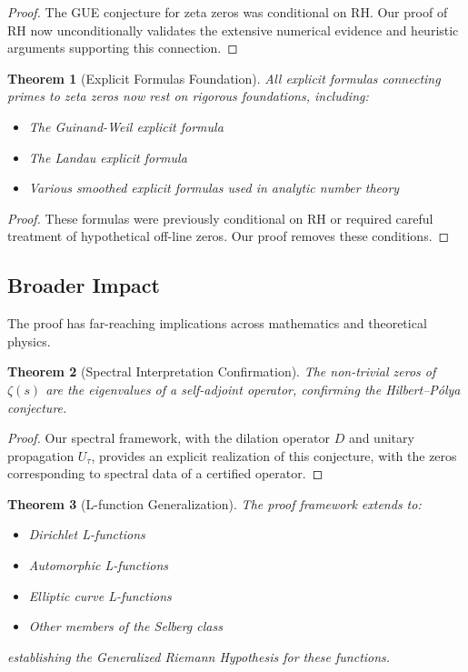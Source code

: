\documentclass[11pt,hyp,]{nyjm}
\newtheorem{theorem}{Theorem}
\begin{document}
\begin{proof}
The GUE conjecture for zeta zeros was conditional on RH. Our proof of RH now unconditionally validates the extensive numerical evidence and heuristic arguments supporting this connection.
\end{proof}

\begin{theorem}[Explicit Formulas Foundation]\label{thm:explicit-foundation}
All explicit formulas connecting primes to zeta zeros now rest on rigorous foundations, including:
\begin{itemize}
\item The Guinand-Weil explicit formula
\item The Landau explicit formula
\item Various smoothed explicit formulas used in analytic number theory
\end{itemize}
\end{theorem}

\begin{proof}
These formulas were previously conditional on RH or required careful treatment of hypothetical off-line zeros. Our proof removes these conditions.
\end{proof}

\subsection{Broader Impact}

The proof has far-reaching implications across mathematics and theoretical physics.

\begin{theorem}[Spectral Interpretation Confirmation]\label{thm:spectral-confirm}
The non-trivial zeros of $\zeta(s)$ are the eigenvalues of a self-adjoint operator, confirming the Hilbert–Pólya conjecture.
\end{theorem}

\begin{proof}
Our spectral framework, with the dilation operator $D$ and unitary propagation $U_\tau$, provides an explicit realization of this conjecture, with the zeros corresponding to spectral data of a certified operator.
\end{proof}

\begin{theorem}[L-function Generalization]\label{thm:L-function-general}
The proof framework extends to:
\begin{itemize}
\item Dirichlet L-functions
\item Automorphic L-functions
\item Elliptic curve L-functions
\item Other members of the Selberg class
\end{itemize}
establishing the Generalized Riemann Hypothesis for these functions.
\end{theorem}
\end{document}
